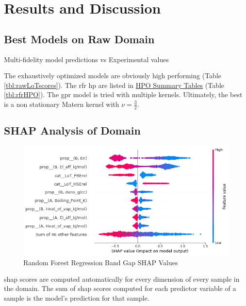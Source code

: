 \documentclass[aip, jmp, amsmath, amssymb, nofootinbib]{revtex4-2}
\begin{document}
\section*{Results and Discussion}
\label{sec:org9df7bc6}
\subsection*{Best Models on Raw Domain}
\label{sec:org73a625b}
 
\begin{multicol}
\centering

\caption{\label{fig:pairplots} Multi-fidelity model predictions vs Experimental values}
\end{multicol}

The exhaustively optimized models are obviously high performing (Table
\ref{tbl:rawLoTscores}). The \acrshort{rfr} \gls{hp} are listed in \hyperref[sec:org8c0870f]{HPO Summary Tables} (Table \ref{tbl:rfrHPO}). The \acrshort{gpr} model is tried with
multiple kernels. Ultimately, the best is a non stationary Matern
kernel with \(\nu = \frac{3}{2}\).

\subsection*{SHAP Analysis of Domain}
\label{sec:orga571974}
\begin{figure}[htbp]
\centering
\includegraphics[width=450pt]{./RFR/.ob-jupyter/704d3204752bc52a936aeb9d96e45380512c8c3d.png}
\caption{\label{fig:rfrSHAP} Random Forest Regression Band Gap SHAP Values}
\end{figure}

\acrshort{shap} scores are computed automatically for every dimension of every
sample in the domain. The sum of \acrshort{shap} scores computed for each
predictor variable of a sample is the model's prediction for that
sample\cite{lundberg-2017-unified-approac}.
\end{document}
